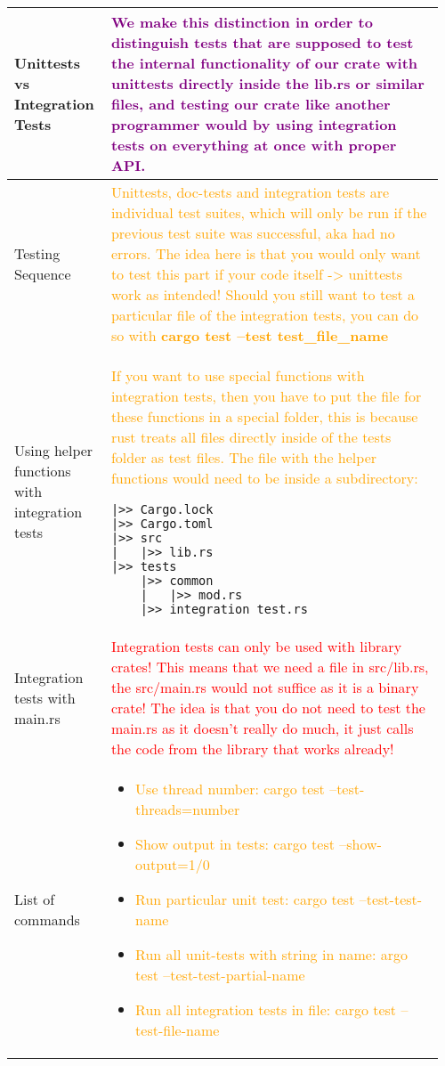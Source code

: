 \documentclass[main.tex,fontsize=8pt,paper=a4,paper=portrait,DIV=calc,]{scrartcl}
\begin{document}
\begin{table}[ht!]
\begin{tabular}{|m{0.2\linewidth}|m{0.755\linewidth}|}
\hline
Unittests vs Integration Tests & 
\textcolor{purple}{We make this distinction in order to distinguish tests that are supposed to test the \textbf{internal functionality of our crate with unittests directly inside the lib.rs or similar files}, and \textbf{testing our crate like another programmer would by using integration tests on everything at once with proper API}.}\\
\hline
Testing Sequence & 
\textcolor{orange}{Unittests, doc-tests and integration tests are individual test suites, which will only be run if the previous test suite was successful, aka had no errors.\newline 
The idea here is that you would only want to test this part if your code itself -> unittests work as intended!\newline
Should you still want to test a particular file of the integration tests, you can do so with \textbf{cargo test --test test\_file\_name}}\\
\hline
Using helper functions with integration tests & 
\textcolor{orange}{If you want to use special functions with integration tests, then you have to put the file for these functions in a special folder, this is because rust treats all files directly inside of the tests folder as test files. The file with the helper functions would need to be inside a subdirectory:}\newline
\begin{lstlisting}
|>> Cargo.lock
|>> Cargo.toml
|>> src
|   |>> lib.rs
|>> tests
    |>> common
    |   |>> mod.rs
    |>> integration_test.rs
\end{lstlisting}\\
\hline
Integration tests with main.rs & 
\textcolor{red}{Integration tests can only be used with library crates! This means that we need a file in src/lib.rs, the src/main.rs would not suffice as it is a binary crate!\newline
The idea is that you do not need to test the main.rs as it doesn't really do much, it just calls the code from the library that works already!}\\
\hline
List of commands & 
\vspace{2mm}
\begin{itemize}
\item \textcolor{orange}{Use thread number: cargo test --test-threads=number}
\item \textcolor{orange}{Show output in tests: cargo test --show-output=1/0}
\item \textcolor{orange}{Run particular unit test: cargo test --test-test-name}
\item \textcolor{orange}{Run all unit-tests with string in name: argo test --test-test-partial-name}
\item \textcolor{orange}{Run all integration tests in file: cargo test --test-file-name}
\vspace{-3mm}
\end{itemize}\\
\hline
\end{tabular}

\end{table}
\end{document}
